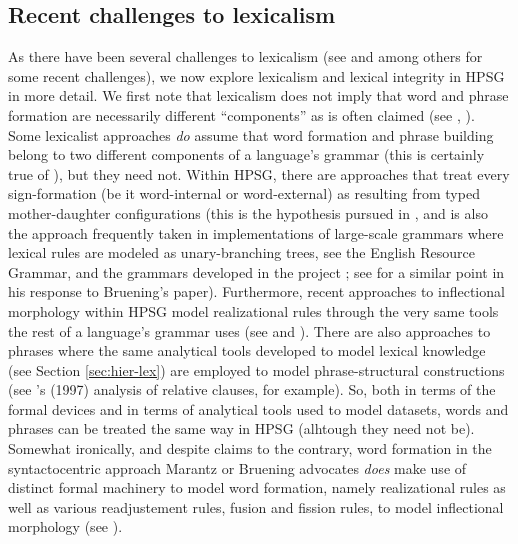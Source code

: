 \documentclass[output=paper]{langsci/langscibook}
\begin{document}
\subsection{Recent challenges to lexicalism}

As there have been several challenges to lexicalism (see \citet{Bruening2018} and  \citet{Haspelmath2011} among others for some recent challenges), we now explore lexicalism and  lexical integrity in HPSG in more detail. We first note that lexicalism does not imply that word and phrase formation are necessarily different ``components'' as is often claimed (see \citet{Marantz1997}, \citealt{Bruening2018}). Some lexicalist approaches \emph{do} assume that word formation and phrase building belong to two different components of a language's grammar (this is certainly true of \citealt{Jackendoff1975}), but they need not. Within HPSG, there are approaches that treat every sign-formation (be it word-internal or word-external) as resulting from typed mother-daughter configurations (this is the hypothesis pursued in , and is also the approach frequently taken in implementations of large-scale grammars where lexical rules are modeled as unary-branching trees, see the English Resource Grammar, \citet{Copestake2002} and the grammars developed in the  project \citet{Mueller2015}; see \citet[e58]{Mueller2018} for a similar point in his response to Bruening's paper). Furthermore, recent approaches to inflectional morphology within HPSG model realizational rules through the very same tools the rest of a language's grammar uses (see \citet{CrysmannandBonami2016} and ).  There are also approaches to phrases where the same analytical tools developed to model lexical knowledge (see Section \ref{sec:hier-lex}) are employed to model phrase-structural constructions (see \citeauthor{Sag1997}'s (1997) analysis of relative clauses, for example). So, both in terms of the formal devices and in terms of analytical tools used to model datasets, words and phrases can be treated the same way in HPSG (alhtough they need not be). Somewhat ironically, and despite claims to the contrary, word formation in the syntactocentric approach Marantz or Bruening advocates \emph{does} make use of distinct formal machinery to model word formation, namely realizational rules as well as various readjustement rules, fusion and fission rules, to model inflectional morphology (see \citealt{HalleandMarantz1993,Embick2015}).
\end{document}
